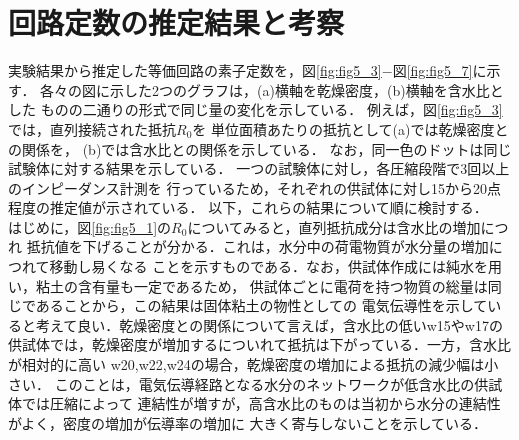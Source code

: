 \section{回路定数の推定結果と考察}
実験結果から推定した等価回路の素子定数を，図\ref{fig:fig5_3}−図\ref{fig:fig5_7}に示す．
各々の図に示した2つのグラフは，(a)横軸を乾燥密度，(b)横軸を含水比とした
ものの二通りの形式で同じ量の変化を示している．
例えば，図\ref{fig:fig5_3}では，直列接続された抵抗$R_0$を
単位面積あたりの抵抗として(a)では乾燥密度との関係を，
(b)では含水比との関係を示している．
なお，同一色のドットは同じ試験体に対する結果を示している．
一つの試験体に対し，各圧縮段階で3回以上のインピーダンス計測を
行っているため，それぞれの供試体に対し15から20点程度の推定値が示されている．
以下，これらの結果について順に検討する．\\

はじめに，図\ref{fig:fig5_1}の$R_0$についてみると，直列抵抗成分は含水比の増加につれ
抵抗値を下げることが分かる．これは，水分中の荷電物質が水分量の増加につれて移動し易くなる
ことを示すものである．なお，供試体作成には純水を用い，粘土の含有量も一定であるため，
供試体ごとに電荷を持つ物質の総量は同じであることから，この結果は固体粘土の物性としての
電気伝導性を示していると考えて良い．乾燥密度との関係について言えば，含水比の低いw15やw17の
供試体では，乾燥密度が増加するについれて抵抗は下がっている．一方，含水比が相対的に高い
w20,w22,w24の場合，乾燥密度の増加による抵抗の減少幅は小さい．
このことは，電気伝導経路となる水分のネットワークが低含水比の供試体では圧縮によって
連結性が増すが，高含水比のものは当初から水分の連結性がよく，密度の増加が伝導率の増加に
大きく寄与しないことを示している．\\


